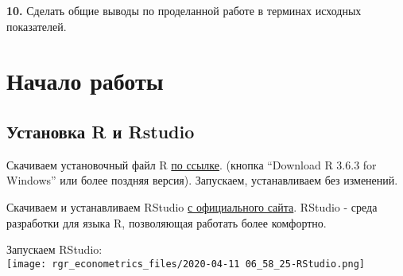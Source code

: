 \documentclass[
]{book}
\begin{document}
\textbf{10.} Сделать общие выводы по проделанной работе в терминах исходных показателей.

\hypertarget{intro}{%
\chapter{Начало работы}\label{intro}}

\hypertarget{ux443ux441ux442ux430ux43dux43eux432ux43aux430-r-ux438-rstudio}{%
\section{Установка R и Rstudio}\label{ux443ux441ux442ux430ux43dux43eux432ux43aux430-r-ux438-rstudio}}

Скачиваем установочный файл R \href{https://cran.r-project.org/bin/windows/base/}{по ссылке}. (кнопка ``Download R 3.6.3 for Windows'' или более поздняя версия). Запускаем, устанавливаем без изменений.

Скачиваем и устанавливаем RStudio \href{https://rstudio.com/products/rstudio/download/\#download}{с официального сайта}. RStudio - среда разработки для языка R, позволяющая работать более комфортно.

Запускаем RStudio:\\
\texttt{[image: rgr\_econometrics\_files/2020-04-11 06\_58\_25-RStudio.png]}

  
\end{document}
